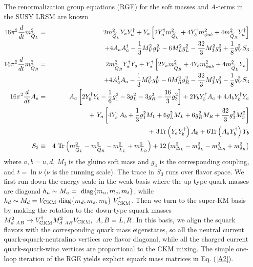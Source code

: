 \documentclass[prd,aps,preprint,tightenlines,superscriptaddress]{revtex4}
\begin{document}
The renormalization group equations (RGE) for the soft masses and $A$-terms in the SUSY LRSM are known \cite{rge}
\begin{eqnarray}\label{rge}
16 \pi^2 \frac{d}{d t} m_{\widetilde Q_L}^2 &=& 2 m_{\widetilde Q_L}^2 Y_a Y_a^{\dag} +
Y_a \left[ 2 Y_a^\dag  m_{\widetilde Q_L}^2 + 4 Y_b^\dag m_{\phi a b}^2 + 4 m_{\widetilde
Q_R}^2 Y_a^\dag \right] \nonumber \\
&& + 4 A_{a} A_{a}^\dag - \frac{1}{3} M_V^2 g_V^2 - 6 M_L^2
g_L^2 - \frac{32}{3} M_3^2 g_3^2 + \frac{1}{8} g_V^2 S_3 \nonumber \\
16 \pi^2 \frac{d}{d t} m_{\widetilde Q_R}^2 &=& 2 m_{\widetilde Q_R}^2 Y_a^{\dag} Y_a +
Y_a^\dag \left[ 2 Y_a  m_{\widetilde Q_R}^2 + 4 Y_b m_{\phi a b}^2 + 4 m_{\widetilde
Q_L}^2 Y_a \right] \nonumber \\
&& + 4 A_{a}^\dag A_{a} - \frac{1}{3} M_V^2 g_V^2 - 6 M_R^2 g_R^2 -
\frac{32}{3} M_3^2 g_3^2 - \frac{1}{8} g_V^2 S_3 \nonumber \\
16 \pi^2 \frac{d}{d t} A_a &=& A_a \left[ 2 Y_b^\dag Y_b - \frac{1}{6} g_1^2 - 3 g_L^2 - 3 g_R^2 - \frac{16}{3} g_3^2 \right] + 2 Y_b Y_b^\dag A_a + 4 A_b Y_b^\dag Y_a \nonumber \\
& &+\ Y_a \left[ 4 Y_b^\dag A_b + \frac{1}{3} g_1^2 M_1 + 6 g_L^2 M_L + 6 g_R^2 M_R + \frac{32}{3} g_3^2 M_3^2 \right] \nonumber \\
& &+\ 3 {\rm Tr} \left( Y_a Y_b^\dag \right) A_b + 6 {\rm Tr} \left( A_a Y_b^\dag \right) Y_b \nonumber \\
S_3 &\equiv& 4 {~\rm Tr}\left( m_{\widetilde Q_L}^2 - m_{\widetilde
Q_R}^2 - m_{\widetilde L_L}^2 + m_{\widetilde L_R}^2 \right) + 12
\left( m_{\Delta_L}^2 - m_{\delta_L}^2 - m_{\Delta_R}^2 +
m_{\delta_R}^2 \right)
\end{eqnarray}
where $a,b=u,d$, $M_3$ is the gluino soft mass and $g_3$ is the corresponding coupling,
and $t = \ln \nu$ ($\nu$ is the running scale). The trace in $S_3$ runs over flavor
space. We first run down the energy scale in the weak basis where the up-type quark masses are diagonal $h_u \sim
M_u = {~\rm diag}\{m_u, m_c, m_t \}$, while $h_d \sim M_d = V_{\rm CKM} {~\rm diag}\{m_d,
m_s, m_b \}\ V_{\rm CKM}^\dag$. Then we turn to the super-KM basis by making the
rotation to the down-type squark masses $M^{2}_{d\ AB} \rightarrow V_{\rm CKM}^{\dag}
M^{2}_{d\ AB} V_{\rm CKM},\ A,B=L,R$. In this basis, we align the squark flavors with the
corresponding quark mass eigenstates, so all the neutral current quark-squark-neutralino
vertices are flavor diagonal, while all the charged current quark-squark-wino vertices
are proportional to the CKM mixing. The simple one-loop iteration of the RGE yields
explicit squark mass matrices in Eq. (\ref{A2}).
\end{document}
